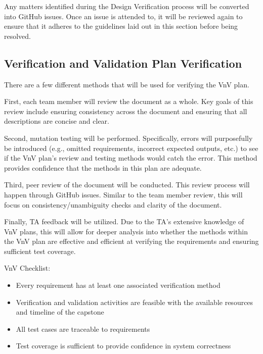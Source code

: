 \documentclass[12pt, titlepage]{article}
\renewcommand{\wss}[1]{}
\begin{document}
Any matters identified during the Design Verification process will be converted into GitHub issues. Once an issue is attended to, it will be reviewed again to ensure that it adheres to the guidelines laid out in this section before being resolved.

\subsection{Verification and Validation Plan Verification}

\wss{The verification and validation plan is an artifact that should also be
verified.  Techniques for this include review and mutation testing.}

\wss{The review will include reviews by your classmates}

\wss{Create a checklists?}

There are a few different methods that will be used for verifying the VnV plan.

First, each team member will review the document as a whole. Key goals of this review include ensuring consistency across the document and ensuring that all descriptions are concise and clear.

Second, mutation testing will be performed. Specifically, errors will purposefully be introduced (e.g., omitted requirements, incorrect expected outputs, etc.) to see if the VnV plan's review and testing methods would catch the error. This method provides confidence that the methods in this plan are adequate.

Third, peer review of the document will be conducted. This review process will happen through GitHub issues. Similar to the team member review, this will focus on consistency/unambiguity checks and clarity of the document.

Finally, TA feedback will be utilized. Due to the TA's extensive knowledge of VnV plans, this will allow for deeper analysis into whether the methods within the VnV plan are effective and efficient at verifying the requirements and ensuring sufficient test coverage.

VnV Checklist:

\begin{itemize}
  \item Every requirement has at least one associated verification method
  \item Verification and validation activities are feasible with the available resources and timeline of the capstone
  \item All test cases are traceable to requirements
  \item Test coverage is sufficient to provide confidence in system correctness
\end{itemize}
\end{document}
